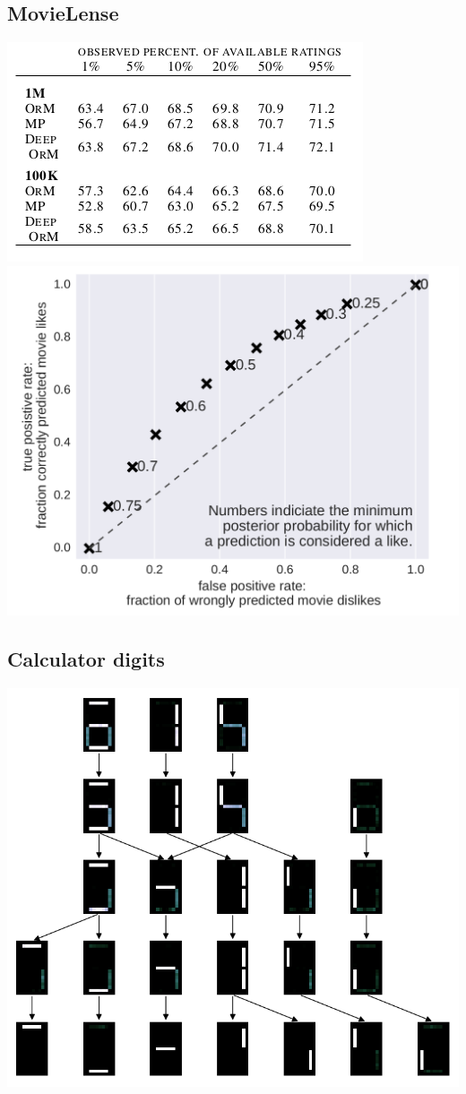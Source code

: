 \documentclass[11pt]{article}
\begin{document}
\subsection*{MovieLense}
\label{sec-4-3}
\includegraphics[width=.9\linewidth]{./movielense1.png}
\includegraphics[width=.9\linewidth]{./ml_roc.png}
\subsection*{Calculator digits}
\label{sec-4-4}
\includegraphics[width=.9\linewidth]{./calc_hierarchy.png}
\end{document}
